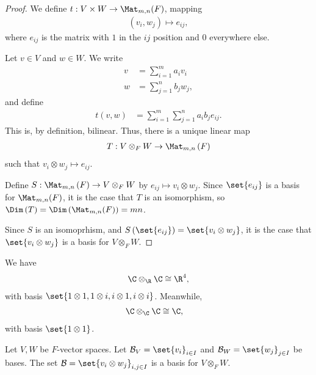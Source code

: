 \documentclass[10pt]{mypackage}
\begin{document}
  \begin{proof}
    We define $t: V\times W\rightarrow \Mat_{m,n}(F)$, mapping
    \begin{align*}
      \left(v_i,w_j\right) \mapsto e_{ij},
    \end{align*}
    where $e_{ij}$ is the matrix with $1$ in the $ij$ position and $0$ everywhere else.\newline

    Let $v\in V$ and $w\in W$. We write
    \begin{align*}
      v &= \sum_{i=1}^{m}a_iv_i\\
      w &= \sum_{j=1}^{n}b_jw_j,
    \end{align*}
    and define
    \begin{align*}
      t\left(v,w\right) &= \sum_{i=1}^{m}\sum_{j=1}^{n}a_ib_je_{ij}.
    \end{align*}
    This is, by definition, bilinear. Thus, there is a unique linear map
    \begin{align*}
      T: V\otimes_{F} W \rightarrow \Mat_{m,n}\left(F\right)
    \end{align*}
    such that $v_i\otimes w_j \mapsto e_{ij}$.\newline

    Define $S: \Mat_{m,n}\left(F\right)\rightarrow V\otimes_{F} W$ by $e_{ij}\mapsto v_i\otimes w_j$. Since $\set{e_{ij}}$ is a basis for $\Mat_{m,n}(F)$, it is the case that $T$ is an isomorphism, so $\Dim\left(T\right) = \Dim\left(\Mat_{m,n}(F)\right) = mn$.\newline

    Since $S$ is an isomoprhism, and $S\left(\set{e_{ij}}\right) = \set{v_i\otimes w_j}$, it is the case that $\set{v_{i}\otimes w_j}$ is a basis for $V\otimes_{F} W$.
  \end{proof}
  \begin{example}
    We have
    \begin{align*}
      \C\otimes_{\R}\C \cong \R^{4},
    \end{align*}
    with basis $\set{1\otimes 1,1\otimes i, i\otimes 1,i\otimes i}$. Meanwhile,
    \begin{align*}
      \C\otimes_{\C}\C &\cong \C,
    \end{align*}
    with basis $\set{1\otimes 1}$.
  \end{example}
  \begin{theorem}
    Let $V,W$ be $F$-vector spaces. Let $\mathcal{B}_{V} = \set{v_i}_{i\in I}$ and $\mathcal{B}_{W} = \set{w_{j}}_{j\in I}$ be bases. The set $\mathcal{B} = \set{v_i\otimes w_j}_{i,j\in I}$ is a basis for $V\otimes_{F} W$.
  \end{theorem}
\end{document}

